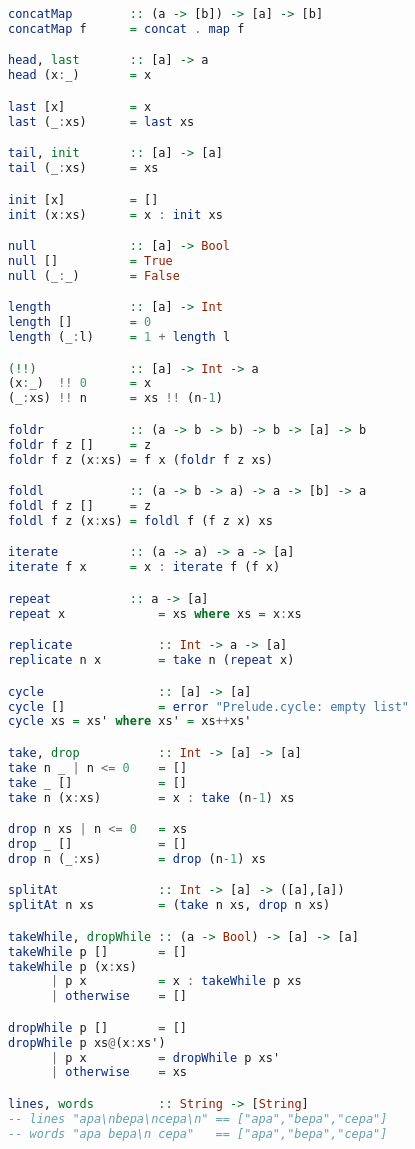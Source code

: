 \documentclass[a4paper]{article}
\begin{document}
\begin{lstlisting}[numbers=none, multicols=2,language=Haskell]
concatMap        :: (a -> [b]) -> [a] -> [b]
concatMap f      = concat . map f

head, last       :: [a] -> a
head (x:_)       = x

last [x]         = x
last (_:xs)      = last xs

tail, init       :: [a] -> [a]
tail (_:xs)      = xs

init [x]         = []
init (x:xs)      = x : init xs

null             :: [a] -> Bool
null []          = True
null (_:_)       = False

length           :: [a] -> Int
length []        = 0
length (_:l)     = 1 + length l

(!!)             :: [a] -> Int -> a
(x:_)  !! 0      = x
(_:xs) !! n      = xs !! (n-1)

foldr            :: (a -> b -> b) -> b -> [a] -> b
foldr f z []     = z 
foldr f z (x:xs) = f x (foldr f z xs)

foldl            :: (a -> b -> a) -> a -> [b] -> a
foldl f z []     = z 
foldl f z (x:xs) = foldl f (f z x) xs

iterate          :: (a -> a) -> a -> [a] 
iterate f x      = x : iterate f (f x)

repeat           :: a -> [a]
repeat x             = xs where xs = x:xs

replicate            :: Int -> a -> [a]
replicate n x        = take n (repeat x)

cycle                :: [a] -> [a]
cycle []             = error "Prelude.cycle: empty list"
cycle xs = xs' where xs' = xs++xs'

take, drop           :: Int -> [a] -> [a] 
take n _ | n <= 0    = []
take _ []            = []
take n (x:xs)        = x : take (n-1) xs

drop n xs | n <= 0   = xs
drop _ []            = []
drop n (_:xs)        = drop (n-1) xs

splitAt              :: Int -> [a] -> ([a],[a])
splitAt n xs         = (take n xs, drop n xs)

takeWhile, dropWhile :: (a -> Bool) -> [a] -> [a]
takeWhile p []       = []
takeWhile p (x:xs)
      | p x          = x : takeWhile p xs
      | otherwise    = []

dropWhile p []       = []
dropWhile p xs@(x:xs')
      | p x          = dropWhile p xs'
      | otherwise    = xs

lines, words         :: String -> [String]
-- lines "apa\nbepa\ncepa\n" == ["apa","bepa","cepa"] 
-- words "apa bepa\n cepa"   == ["apa","bepa","cepa"]


\end{lstlisting}
\end{document}
